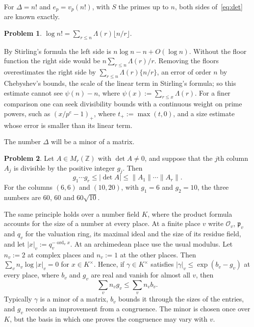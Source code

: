 \documentclass[reqno]{amsart}
\theoremstyle{definition}
\newtheorem{problem}{Problem}[section]
\theoremstyle{plain}
\newcommand{\Z}{\mathbb{Z}}
\newcommand{\Oc}{\mathcal{O}}
\newcommand{\pp}{\mathfrak{p}}
\begin{document}
For \(\Delta = n!\) and \(e_p = v_p(n!)\), with \(S\) the primes up to \(n\), both sides of~\eqref{eq:det} are known exactly.

\begin{problem}\label{pr:legendre}
\(\log n! = \sum_{r \le n} \Lambda(r) \lfloor n/r \rfloor\).
\end{problem}

By Stirling's formula the left side is \(n\log n - n + O(\log n)\).  Without the floor function the right side would be \(n \sum_{r \le n} \Lambda(r)/r\).  Removing the floors overestimates the right side by \(\sum_{r \le n} \Lambda(r) \{n/r\}\), an error of order \(n\) by Chebyshev's bounds, the scale of the linear term in Stirling's formula; so this estimate cannot see \(\psi(n) - n\), where \(\psi(x) := \sum_{r \le x} \Lambda(r)\).  For a finer comparison one can seek divisibility bounds with a continuous weight on prime powers, such as \((x/p^e - 1)_+\), where \(t_+ := \max(t, 0)\), and a size estimate whose error is smaller than its linear term.

The number \(\Delta\) will be a minor of a matrix.

\begin{problem}\label{pr:hadamard-det}
Let \(A \in M_r(\Z)\) with \(\det A \ne 0\), and suppose that the \(j\)th column \(A_j\) is divisible by the positive integer \(g_j\).  Then
\[
  g_1 \cdots g_r \le \lvert \det A \rvert \le \lVert A_1 \rVert \cdots \lVert A_r \rVert .
\]
For the columns \((6, 6)\) and \((10, 20)\), with \(g_1 = 6\) and \(g_2 = 10\), the three numbers are \(60\), \(60\) and \(60\sqrt{10}\).
\end{problem}

The same principle holds over a number field \(K\), where the product formula accounts for the size of a number at every place.  At a finite place \(v\) write \(\Oc_v\), \(\pp_v\) and \(q_v\) for the valuation ring, its maximal ideal and the size of its residue field, and let \(\lvert x \rvert_v := q_v^{-\operatorname{ord}_v x}\).  At an archimedean place use the usual modulus.  Let \(n_v := 2\) at complex places and \(n_v := 1\) at the other places.  Then \(\sum_v n_v \log \lvert x \rvert_v = 0\) for \(x \in K^\times\).  Hence, if \(\gamma \in K^\times\) satisfies \(\lvert \gamma \rvert_v \le \exp(b_v - g_v)\) at every place, where \(b_v\) and \(g_v\) are real and vanish for almost all \(v\), then
\begin{equation}\label{eq:scalar}
  \sum_v n_v g_v \le \sum_v n_v b_v .
\end{equation}
Typically \(\gamma\) is a minor of a matrix, \(b_v\) bounds it through the sizes of the entries, and \(g_v\) records an improvement from a congruence.  The minor is chosen once over \(K\), but the basis in which one proves the congruence may vary with \(v\).
\end{document}
